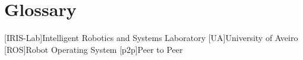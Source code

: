 \chapter{Glossary}

\footnotesize
\SingleSpacing

\begin{multicols}{2}
\begin{acronym}[AAAAAA]

	[IRIS-Lab]{Intelligent Robotics and Systems Laboratory}
	[UA]{University of Aveiro}
	[ROS]{Robot Operating System}
	[p2p]{Peer to Peer}

\end{acronym}
\end{multicols}


